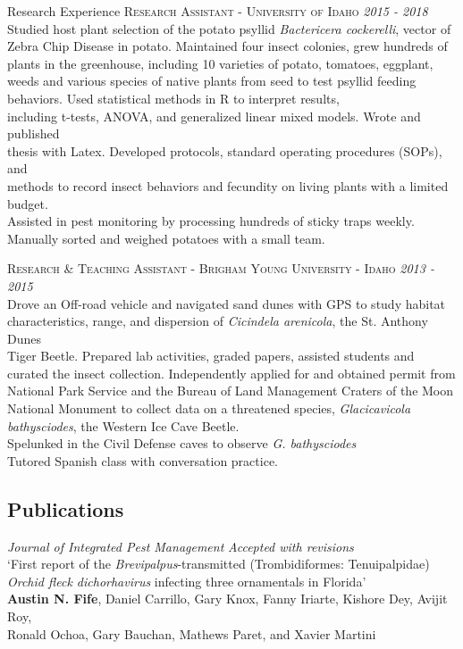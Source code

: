 \documentclass{resume} %
\begin{document}
\begin{rSection}{Research Experience}
\textsc{Research Assistant - University of Idaho} \hfill {\em \textit{2015 - 2018}}\\
Studied host plant selection of the potato psyllid \textit{Bactericera cockerelli}, vector of Zebra Chip Disease in potato. Maintained four insect colonies, grew hundreds of plants in the greenhouse, including 10 varieties of potato, tomatoes, eggplant, weeds and various species of native plants from seed to test psyllid feeding behaviors. Used statistical methods in R to interpret results,\\
including t-tests, ANOVA, and generalized linear mixed models. Wrote and published\\ thesis with Latex. Developed protocols, standard operating procedures (SOPs), and\\ methods to record insect behaviors and fecundity on living plants with a limited budget.\\
Assisted in pest monitoring by processing hundreds of sticky traps weekly. Manually sorted and weighed potatoes with a small team.\\ \hfill

\textsc{Research \& Teaching Assistant - Brigham Young University - Idaho} \hfill {\em \textit{2013 - 2015}}\\
Drove an Off-road vehicle and navigated sand dunes with GPS to study habitat\\
characteristics, range, and dispersion of \textit{Cicindela arenicola}, the St. Anthony Dunes\\ Tiger Beetle. Prepared lab activities, graded papers, assisted students and curated the insect collection. Independently applied for and obtained permit from National Park Service and the Bureau of Land Management Craters of the Moon National Monument to collect data on a threatened species, \textit{Glacicavicola bathysciodes}, the Western Ice Cave Beetle.\\
Spelunked in the Civil Defense caves to observe \textit{G. bathysciodes}\\
Tutored Spanish class with conversation practice.\\ \hfill


\subsection*{Publications}
\textit{Journal of Integrated Pest Management} \hfill {\em \textit{Accepted with revisions}}\\
`First report of the \textit{Brevipalpus}-transmitted (Trombidiformes: Tenuipalpidae)\\
\textit{Orchid fleck dichorhavirus} infecting three ornamentals in Florida'\\
\textbf{Austin N. Fife}, Daniel Carrillo, Gary Knox, Fanny Iriarte, Kishore Dey, Avijit Roy,\\
 Ronald Ochoa, Gary Bauchan, Mathews Paret, and Xavier Martini\\ \hfill
 

\end{rSection}
\end{document}
